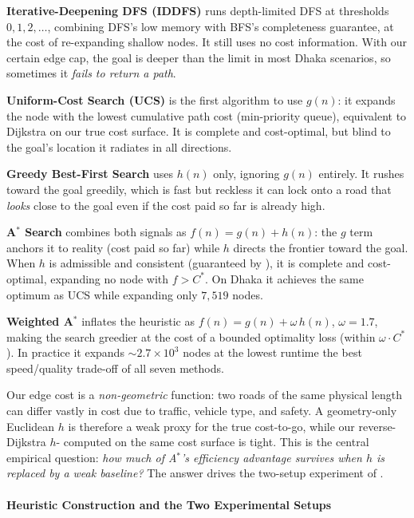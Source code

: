 \documentclass{ai-lab-report}
\begin{document}
\textbf{Iterative-Deepening DFS (IDDFS)} runs depth-limited DFS at thresholds $0,1,2,\ldots$, 
combining DFS's low memory with BFS's completeness guarantee, at the cost of re-expanding shallow nodes. 
It still uses no cost information. With our certain edge cap, the goal is deeper than the limit in most Dhaka scenarios, so sometimes it \emph{fails to return a path}.

\textbf{Uniform-Cost Search (UCS)} is the first algorithm to use $g(n)$: it expands the node with the lowest cumulative path cost (min-priority queue), 
equivalent to Dijkstra on our true cost surface. It is complete and cost-optimal, but blind to the goal's location it radiates in all directions.

\textbf{Greedy Best-First Search} uses $h(n)$ only, ignoring $g(n)$ entirely. It rushes toward the goal greedily, which is fast but reckless 
it can lock onto a road that \emph{looks} close to the goal even if the cost paid so far is already high. 

\textbf{A$^\ast$ Search} combines both signals as $f(n)=g(n)+h(n)$: the $g$ term anchors it to reality (cost paid so far) while $h$ directs 
the frontier toward the goal. When $h$ is admissible and consistent (guaranteed by ), it is complete and cost-optimal, 
expanding no node with $f>C^\ast$. On Dhaka it achieves the same optimum as UCS while expanding only $7{,}519$ nodes.

\textbf{Weighted A$^\ast$} inflates the heuristic as $f(n)=g(n)+\omega\,h(n)$, $\omega=1.7$, 
making the search greedier at the cost of a bounded optimality loss (within $\omega \cdot C^\ast$). 
In practice it expands ${\sim}2.7\times10^3$ nodes at the lowest runtime the best speed/quality trade-off of all seven methods.

Our edge cost is a \emph{non-geometric} function: two roads of the same physical length can differ 
vastly in cost due to traffic, vehicle type, and safety. A geometry-only Euclidean $h$ is therefore a 
weak proxy for the true cost-to-go, while our reverse-Dijkstra $h$- computed on the same cost surface is tight. 
This is the central empirical question: \emph{how much of A$^\ast$'s efficiency advantage survives when $h$ is replaced by a weak baseline?} 
The answer drives the two-setup experiment of .



\paragraph{Heuristic Construction and the Two Experimental Setups}
\end{document}
